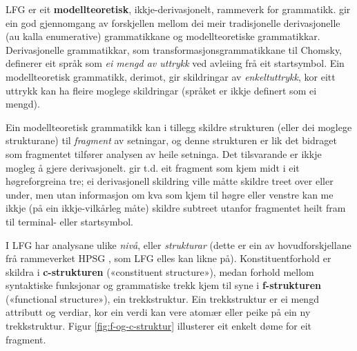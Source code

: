 \documentclass[12pt,a4paper,oneside,draft]{report}
\begin{document}
 LFG er eit \textbf{modellteoretisk}, ikkje-derivasjonelt, rammeverk for
 grammatikk.  \citet{pullum2001dbm} gir ein god gjennomgang av
 forskjellen mellom dei meir tradisjonelle derivasjonelle (au kalla
 enumerative) grammatikkane og modellteoretiske
 grammatikkar. Derivasjonelle grammatikkar, som
 transformasjonsgrammatikkane til Chomsky, definerer eit språk som \emph{ei  mengd av uttrykk} ved avleiing frå eit startsymbol. Ein
 modellteoretisk grammatikk, derimot, gir skildringar av
 \emph{enkeltuttrykk}, kor eitt uttrykk kan ha fleire moglege skildringar
 (språket er ikkje definert som ei mengd).

 Ein modellteoretisk grammatikk kan i tillegg skildre strukturen
 (eller dei moglege strukturane) til \emph{fragment} av setningar, og denne
 strukturen er lik det bidraget som fragmentet tilfører analysen av
 heile setninga. Det tilsvarande er ikkje mogleg å gjere
 derivasjonelt. \citet[s.~32--33]{pullum2001dbm} gir t.d. eit fragment
 som kjem midt i eit høgreforgreina tre; ei derivasjonell skildring
 ville måtte skildre treet over eller under, men utan informasjon om
 kva som kjem til høgre eller venstre kan me ikkje (på ein
 ikkje-vilkårleg måte) skildre subtreet utanfor fragmentet heilt fram
 til terminal- eller startsymbol.

 I LFG har analysane ulike \emph{nivå}, eller \emph{strukturar} (dette er ein av
 hovudforskjellane frå rammeverket HPSG \citep{swb-hpsg}, som LFG
 elles kan likne på). Konstituentforhold er skildra i \textbf{c\hyp{}strukturen}
 («constituent structure»), medan forhold mellom syntaktiske
 funksjonar og grammatiske trekk kjem til syne i \textbf{f\hyp{}strukturen}
 («functional structure»), ein trekkstruktur. Ein trekkstruktur er ei
 mengd attributt og verdiar, kor ein verdi kan vere atomær eller peike
 på ein ny trekkstruktur.  Figur \ref{fig:f-og-c-struktur} illusterer
 eit enkelt døme for eit fragment.
\end{document}
